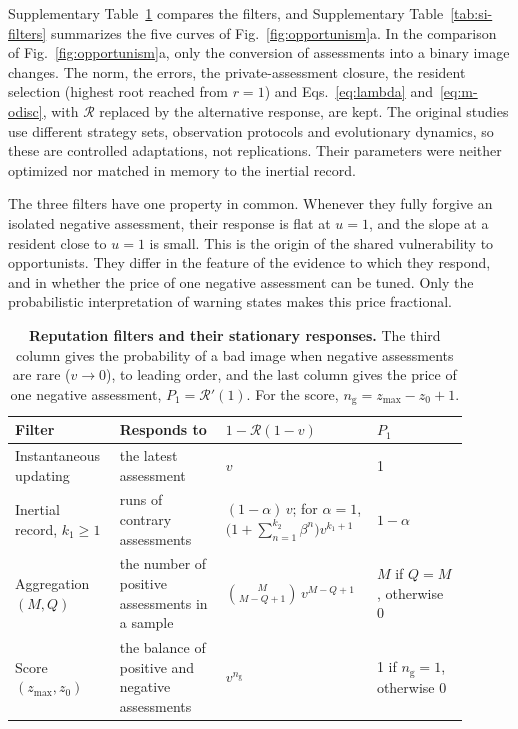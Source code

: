 \documentclass[10pt]{wlscirep}
\newcommand{\Rmap}{\mathscr{R}}            %
\newcommand{\Pone}{P_{1}}                  %
\theoremstyle{plain}
\theoremstyle{remark}
\begin{document}
Supplementary Table~\ref{tab:si-filter-forms} compares the filters, and Supplementary Table~\ref{tab:si-filters} summarizes the five curves of Fig.~\ref{fig:opportunism}a. In the comparison of Fig.~\ref{fig:opportunism}a, only the conversion of assessments into a binary image changes. The norm, the errors, the private-assessment closure, the resident selection (highest root reached from $r=1$) and Eqs.~\eqref{eq:lambda} and~\eqref{eq:m-odisc}, with $\Rmap$ replaced by the alternative response, are kept. The original studies use different strategy sets, observation protocols and evolutionary dynamics, so these are controlled adaptations, not replications. Their parameters were neither optimized nor matched in memory to the inertial record.

The three filters have one property in common. Whenever they fully forgive an isolated negative assessment, their response is flat at $u=1$, and the slope at a resident close to $u=1$ is small. This is the origin of the shared vulnerability to opportunists. They differ in the feature of the evidence to which they respond, and in whether the price of one negative assessment can be tuned. Only the probabilistic interpretation of warning states makes this price fractional.

\begin{table}[!htbp]
\centering
\caption{\textbf{Reputation filters and their stationary responses.} The third column gives the probability of a bad image when negative assessments are rare ($v\to0$), to leading order, and the last column gives the price of one negative assessment, $\Pone=\Rmap'(1)$. For the score, $n_{\mathrm g}=z_{\max}-z_0+1$.}
\label{tab:si-filter-forms}
\small
\begin{tabular}{@{}p{0.2\linewidth}p{0.22\linewidth}p{0.29\linewidth}p{0.19\linewidth}@{}}
\toprule
Filter & Responds to & $1-\Rmap(1-v)$ & $\Pone$\\
\midrule
Instantaneous updating & the latest assessment & $v$ & 1\\
Inertial record, $k_1\geq1$ & runs of contrary assessments & $(1-\alpha)\,v$; for $\alpha=1$, $\bigl(1+\sum_{n=1}^{k_2}\beta^n\bigr)v^{k_1+1}$ & $1-\alpha$\\
Aggregation $(M,Q)$ & the number of positive assessments in a sample & $\binom{M}{M-Q+1}\,v^{M-Q+1}$ & $M$ if $Q=M$, otherwise 0\\
Score $(z_{\max},z_0)$ & the balance of positive and negative assessments & $v^{n_{\mathrm g}}$ & 1 if $n_{\mathrm g}=1$, otherwise 0\\
\bottomrule
\end{tabular}
\end{table}
\end{document}
